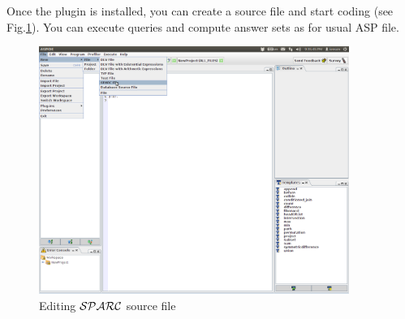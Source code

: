 \documentclass[12pt, letterpaper]{article}
\begin{document}
Once the plugin is installed, you can create a source file and start coding (see Fig.\ref{fig:sparc_file}).
You can execute queries and compute answer sets as for usual ASP file.
\begin{figure}[p]
\centering
\includegraphics[width=0.9\textwidth]{sparc_file.png}
\caption{Editing  ${\cal SPARC}$ source file}
\label{fig:sparc_file}
\end{figure}
\end{document}
